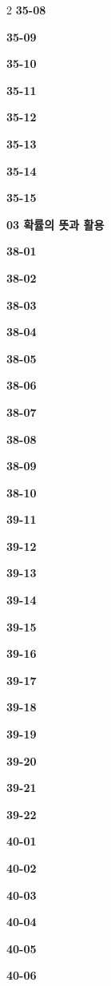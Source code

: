 \documentclass[10pt,a4paper]{article}
\begin{document}
\begin{multicols}{2}
\noindent\textbf{35-08}\ \par
\noindent\textbf{35-09}\ \par
\noindent\textbf{35-10}\ \par
\noindent\textbf{35-11}\ \par
\noindent\textbf{35-12}\ \par
\noindent\textbf{35-13}\ \par
\noindent\textbf{35-14}\ \par
\noindent\textbf{35-15}\ \par
\noindent\textbf{03 확률의 뜻과 활용}\par\smallskip
\noindent\textbf{38-01}\ \par
\noindent\textbf{38-02}\ \par
\noindent\textbf{38-03}\ \par
\noindent\textbf{38-04}\ \par
\noindent\textbf{38-05}\ \par
\noindent\textbf{38-06}\ \par
\noindent\textbf{38-07}\ \par
\noindent\textbf{38-08}\ \par
\noindent\textbf{38-09}\ \par
\noindent\textbf{38-10}\ \par
\noindent\textbf{39-11}\ \par
\noindent\textbf{39-12}\ \par
\noindent\textbf{39-13}\ \par
\noindent\textbf{39-14}\ \par
\noindent\textbf{39-15}\ \par
\noindent\textbf{39-16}\ \par
\noindent\textbf{39-17}\ \par
\noindent\textbf{39-18}\ \par
\noindent\textbf{39-19}\ \par
\noindent\textbf{39-20}\ \par
\noindent\textbf{39-21}\ \par
\noindent\textbf{39-22}\ \par
\noindent\textbf{40-01}\ \par
\noindent\textbf{40-02}\ \par
\noindent\textbf{40-03}\ \par
\noindent\textbf{40-04}\ \par
\noindent\textbf{40-05}\ \par
\noindent\textbf{40-06}\ \par

\end{multicols}
\end{document}
